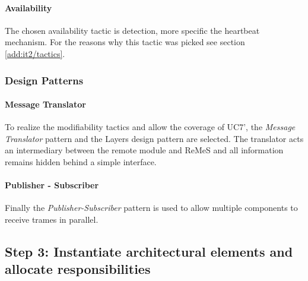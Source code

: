 \paragraph{Availability}

\npar The chosen availability tactic is detection, more specific the heartbeat
mechanism. For the reasons why this tactic was picked see section
\ref{add:it2/tactics}.

\subsubsection{Design Patterns}
\label{add:it2/patterns}

\paragraph{Message Translator}

\npar To realize the modifiability tactics and allow the coverage of UC7', the
\emph{Message Translator} pattern \citep[see][p.~229]{Buschmann:07} and the
Layers design pattern \citep[see][p.~185]{Buschmann:07} are selected.
The translator acts an intermediary between the remote module and ReMeS and all
information remains hidden behind a simple interface.

\paragraph{Publisher - Subscriber}

\npar Finally the \emph{Publisher-Subscriber} pattern
\citep[see][p.~234]{Buschmann:07} is used to allow multiple components to
receive trames in parallel.

\subsection{Step 3: Instantiate architectural elements and allocate responsibilities}
\label{add:it2/elements}

